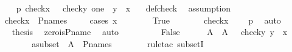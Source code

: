 \begin{isabellebody}
\ \ \isamarkupfalse%
\ p{}{\isacharcolon}{\kern0pt}\ {\isachardoublequoteopen}check{\isacharparenleft}{\kern0pt}x{\isacharparenright}{\kern0pt}\ {\isacharequal}{\kern0pt}\ {\isacharbraceleft}{\kern0pt}\ {\isacharless}{\kern0pt}check{\isacharparenleft}{\kern0pt}y{\isacharparenright}{\kern0pt}{\isacharcomma}{\kern0pt}\ one{\isachargreater}{\kern0pt}\ {\isachardot}{\kern0pt}\ y\ {\isasymin}\ x\ {\isacharbraceright}{\kern0pt}{\isachardoublequoteclose}\ \isamarkupfalse%
\ def{\isacharunderscore}{\kern0pt}check\ \isamarkupfalse%
\ assumption\isanewline
\ \ \isamarkupfalse%
\ \isamarkupfalse%
\ {\isachardoublequoteopen}check{\isacharparenleft}{\kern0pt}x{\isacharparenright}{\kern0pt}\ {\isasymin}\ P{\isacharunderscore}{\kern0pt}names{\isachardoublequoteclose}\ \isanewline
\ \ \isamarkupfalse%
\ {\isacharparenleft}{\kern0pt}cases\ {\isachardoublequoteopen}x\ {\isacharequal}{\kern0pt}\ {}{\isachardoublequoteclose}{\isacharparenright}{\kern0pt}\isanewline
\ \ \ \ \isamarkupfalse%
\ True\isanewline
\ \ \ \ \isamarkupfalse%
\ \isamarkupfalse%
\ {\isachardoublequoteopen}check{\isacharparenleft}{\kern0pt}x{\isacharparenright}{\kern0pt}\ {\isacharequal}{\kern0pt}\ {}{\isachardoublequoteclose}\ \isamarkupfalse%
\ p{}\ \isamarkupfalse%
\ auto\ \isanewline
\ \ \ \ \isamarkupfalse%
\ \isamarkupfalse%
\ {\isacharquery}{\kern0pt}thesis\ \isamarkupfalse%
\ zero{\isacharunderscore}{\kern0pt}is{\isacharunderscore}{\kern0pt}P{\isacharunderscore}{\kern0pt}name\ \isamarkupfalse%
\ auto\ \isanewline
\ \ \isamarkupfalse%
\isanewline
\ \ \ \ \isamarkupfalse%
\ False\isanewline
\ \ \ \ \isamarkupfalse%
\ A\ \ {\isachardoublequoteopen}A\ {\isasymequiv}\ {\isacharbraceleft}{\kern0pt}\ check{\isacharparenleft}{\kern0pt}y{\isacharparenright}{\kern0pt}{\isachardot}{\kern0pt}\ y\ {\isasymin}\ x\ {\isacharbraceright}{\kern0pt}{\isachardoublequoteclose}\ \isanewline
\ \ \ \ \isamarkupfalse%
\ \isamarkupfalse%
\ asubset{\isacharcolon}{\kern0pt}\ \ {\isachardoublequoteopen}A\ {\isasymsubseteq}\ P{\isacharunderscore}{\kern0pt}names{\isachardoublequoteclose}\isanewline
\ \ \ \ \ \ \isamarkupfalse%
\ {\isacharparenleft}{\kern0pt}rule{\isacharunderscore}{\kern0pt}tac\ subsetI{\isacharparenright}{\kern0pt}\ \isanewline

\end{isabellebody}

